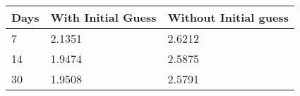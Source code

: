 \begin{tabular}{lll}
Days & With Initial Guess & Without Initial guess \\ 
\hline 
7 & 2.1351 & 2.6212 \\ 
14 & 1.9474 & 2.5875 \\ 
30 & 1.9508 & 2.5791 \\ 
\hline 
\end{tabular}